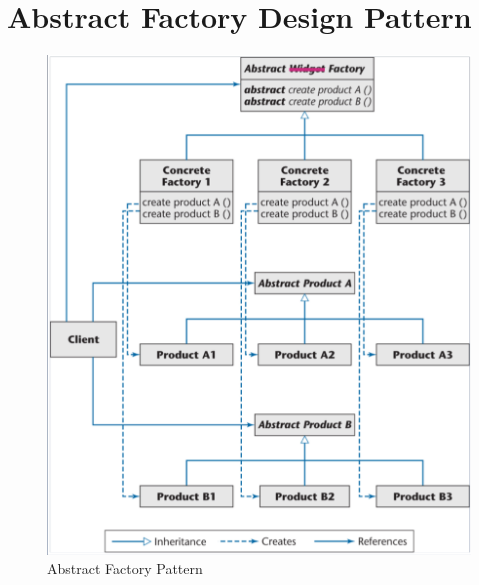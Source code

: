\documentclass[11pt]{article}
\begin{document}
\section*{Abstract Factory Design Pattern}
\begin{figure}[h]
	\centering
	\includegraphics[width=0.9\linewidth]{images/AbstractFactoryPattern.png}
	\caption{Abstract Factory Pattern}
	\label{fig:AbstractFactoryPattern}
\end{figure}

\newpage
\end{document}
